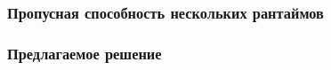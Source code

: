 \documentclass{beamer}
\begin{document}
\begin{frame}[fragile]
  \frametitle{Пропусная способность нескольких рантаймов}

  \begin{center}
  \end{center}
\end{frame}

\begin{frame}[fragile]
  \frametitle{Предлагаемое решение}

  \begin{center}
  \end{center}
\end{frame}
\end{document}
